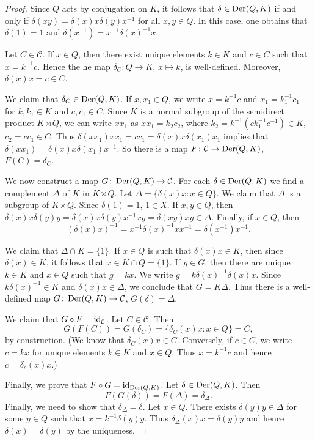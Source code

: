 \begin{proof}
	Since $Q$ acts by conjugation on $K$, it follows that $\delta\in\operatorname{Der}(Q,K)$ if and only if 
	$\delta(xy)=\delta(x)x\delta(y)x^{-1}$ for all $x,y\in Q$. In this case, 
	one obtains that 
	$\delta(1)=1$ and $\delta(x^{-1})=x^{-1}\delta(x)^{-1}x$.
	
	Let 
	$C\in\mathcal{C}$. If $x\in Q$, then there exist unique elements  
	$k\in K$ and $c\in C$ such that $x=k^{-1}c$. Hence the he map 
	$\delta_C\colon Q\to K$, $x\mapsto k$, is well-defined. Moreover, 
	$\delta(x)x=c\in C$. 
	
	We claim that $\delta_C\in\operatorname{Der}(Q,K)$. If $x,x_1\in Q$, we write $x=k^{-1}c$
	and $x_1=k_1^{-1}c_1$ for $k,k_1\in K$ and $c,c_1\in C$. Since $K$ is a normal subgroup of 
	the semidirect product $K\rtimes Q$, we can write $xx_1$ as $xx_1=k_2c_2$, where 
	$k_2=k^{-1}(ck_1^{-1}c^{-1})\in K$, $c_2=cc_1\in C$. Thus  
	$\delta(xx_1)xx_1=cc_1=\delta(x)x\delta(x_1)x_1$ 
	implies that $\delta(xx_1)=\delta(x)x\delta(x_1)x^{-1}$. 
	So there is a map $F\colon\mathcal{C}\to\operatorname{Der}(Q,K)$, $F(C)=\delta_C$.

	We now construct a map $G\colon\operatorname{Der}(Q,K)\to\mathcal{C}$. 
	For each 
	$\delta\in\operatorname{Der}(Q,K)$ we find a complement $\Delta$ of $K$ in $K\rtimes Q$. Let 
	$\Delta=\{\delta(x)x:x\in Q\}$. 
	We claim that $\Delta$ is a subgroup of $K\rtimes Q$. Since $\delta(1)=1$,
	$1\in X$. If $x,y\in Q$, then 
	$\delta(x)x\delta(y)y=\delta(x)x\delta(y)x^{-1}xy=\delta(xy)xy\in \Delta$.
	Finally, if $x\in Q$, then 
	\[
	(\delta(x)x)^{-1}=x^{-1}\delta(x)^{-1}xx^{-1}=\delta(x^{-1})x^{-1}.
	\]
	
	We claim that $\Delta\cap K=\{1\}$. If $x\in Q$ is such that $\delta(x)x\in K$, then 
    since $\delta(x)\in K$, it follows that $x\in K\cap Q=\{1\}$. If $g\in G$, then 
	there are unique $k\in K$ and $x\in Q$ such that $g=kx$. We write 
	$g=k\delta(x)^{-1}\delta(x)x$. Since $k\delta(x)^{-1}\in K$ and $\delta(x)x\in
	\Delta$, we conclude that $G=K\Delta$. Thus there is a well-defined map 
	$G\colon\operatorname{Der}(Q,K)\to\mathcal{C}$, $G(\delta)=\Delta$.

	We claim that $G\circ F=\operatorname{id}_{\mathcal{C}}$. 
	Let $C\in\mathcal{C}$. Then  
	\[
	G(F(C))=G(\delta_C)=\{\delta_C(x)x:x\in
	Q\}=C,
	\]
	by construction. (We know that $\delta_C(x)x\in C$. Conversely, if $c\in
	C$, we write $c=kx$ for unique elements $k\in K$ and $x\in Q$. Thus $x=k^{-1}c$
	and hence $c=\delta_c(x)x$.)

	Finally, we prove that $F\circ G=\operatorname{id}_{\operatorname{Der}(Q,K)}$. Let $\delta\in\operatorname{Der}(Q,K)$.
    Then	
    \[
	F(G(\delta))=F(\Delta)=\delta_{\Delta}.
	\]
	Finally, we need to show that $\delta_\Delta=\delta$.  Let $x\in Q$. There exists 
	$\delta(y)y\in\Delta$ for some $y\in Q$ such that $x=k^{-1}\delta(y)y$.
	Thus $\delta_{\Delta}(x)x=\delta(y)y$ and hence $\delta(x)=\delta(y)$ by
	the uniqueness. 
\end{proof}

